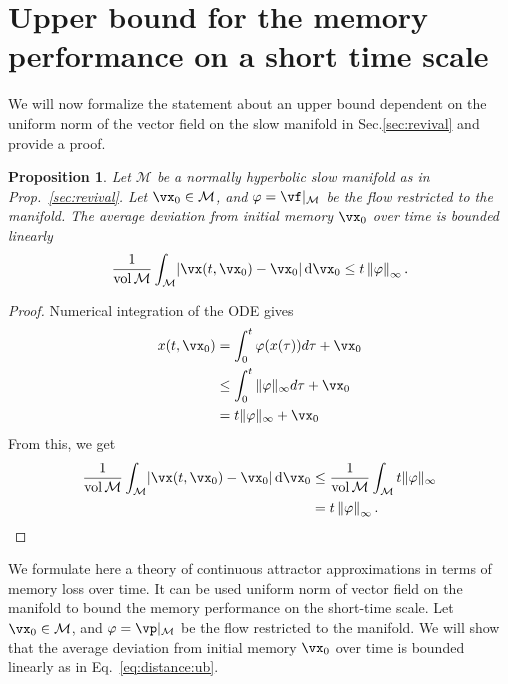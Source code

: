 \documentclass{article} %
\newcounter{ct}
\newcommand{\dm}[1]{\ensuremath{\mathrm{d}{#1}}} %
\newcommand{\manifold}{\mathcal{M}}
\newcommand{\uniformNorm}[1]{\left\|#1\right\|_\infty} %
\DeclarePairedDelimiter{\abs}{\lvert}{\rvert}
\newtheorem{prop}{Proposition}
\theoremstyle{definition}
\theoremstyle{remark}
\begin{document}
\newpage
\section{Upper bound for the memory performance on a short time scale}\label{sec:supp:ub}
We will now formalize the statement about an upper bound dependent on the uniform norm of the vector field on the slow manifold in Sec.\ref{sec:revival} and provide a proof.
\begin{prop}
Let \(\manifold\) be a normally hyperbolic slow manifold as in Prop.~\ref{sec:revival}.
Let \(\vx_0 \in \manifold\), and \(\varphi = \vf\vert_\manifold\) be the flow restricted to the manifold.
The average deviation from initial memory \(\vx_0\) over time is bounded linearly
\begin{align}
\frac{1}{\operatorname{vol}\manifold}\int_\manifold
\abs{\vx(t, \vx_0) - \vx_0}\,
\dm{\vx_0}
\leq t\uniformNorm{\varphi}.
\end{align}
\end{prop}

\begin{proof}
Numerical integration of the ODE gives
\begin{align*}
x(t,\vx_0) &= \int_0^t\varphi(x(\tau))d\tau + \vx_0 \\
&\leq \int_0^t\|\varphi\|_\infty d\tau + \vx_0 \\
&= t\|\varphi\|_\infty+ \vx_0
\end{align*}
From this, we get
\begin{align*}
\frac{1}{\operatorname{vol}\manifold}\int_\manifold
\abs{\vx(t, \vx_0) - \vx_0}\,
\dm{\vx_0} & \leq \frac{1}{\operatorname{vol}\manifold}\int_\manifold t\|\varphi\|_\infty\\
&= t\uniformNorm{\varphi}.
\end{align*}
\end{proof}



We formulate here a theory of continuous attractor approximations in terms of memory loss over time.
It can be used uniform norm of vector field on the manifold to bound the memory performance on the short-time scale. %
Let \(\vx_0 \in \manifold\), and \(\varphi = \vp\vert_\manifold\) be the flow restricted to the manifold.
We will show that the average deviation from initial memory \(\vx_0\) over time is bounded linearly as in Eq.~\ref{eq:distance:ub}.
\end{document}
